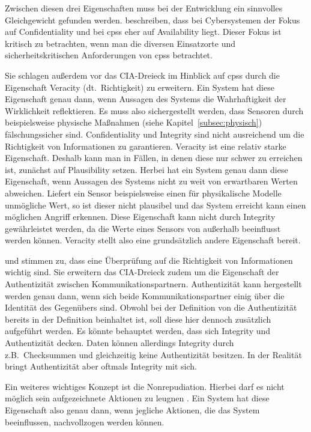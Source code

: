 \documentclass[final,bibliography=totocnumbered]{include/sikseminar}
\newcommand{\cps}{\glspl{cps}\xspace}
\begin{document}
Zwischen diesen drei Eigenschaften muss bei der Entwicklung ein sinnvolles Gleichgewicht gefunden werden.
\citeauthor{GK16} beschreiben, dass bei Cybersystemen der Fokus auf Confidentiality und bei \cps eher auf Availability liegt.
Dieser Fokus ist kritisch zu betrachten, wenn man die diversen Einsatzorte und sicherheitskritischen Anforderungen von \cps betrachtet.

Sie schlagen außerdem vor das CIA-Dreieck im Hinblick auf \cps durch die Eigenschaft Veracity (dt.~Richtigkeit) zu erweitern.
Ein System hat diese Eigenschaft genau dann, wenn Aussagen des Systems die Wahrhaftigkeit der  Wirklichkeit reflektieren.
Es muss also sichergestellt werden, dass Sensoren durch beispielsweise physische Maßnahmen (siehe Kapitel~\ref{subsec:physisch}) fälschungssicher sind.
Confidentiality und Integrity sind nicht ausreichend um die Richtigkeit von Informationen zu garantieren.
Veracity ist eine relativ starke Eigenschaft.
Deshalb kann man in Fällen, in denen diese nur schwer zu erreichen ist, zunächst auf Plausibility setzen.
Herbei hat ein System genau dann diese Eigenschaft, wenn Aussagen des Systems nicht zu weit von erwartbaren Werten abweichen.
Liefert ein Sensor beispielsweise einen für physikalische Modelle unmögliche Wert, so ist dieser nicht plausibel und das System erreicht kann einen möglichen Angriff erkennen. \cite{GK16}
Diese Eigenschaft kann nicht durch Integrity gewährleistet werden, da die Werte eines Sensors von außerhalb beeinflusst werden können.
Veracity stellt also eine grundsätzlich andere Eigenschaft bereit.

\citeauthor{WYX+10} und \citeauthor{SFJ17} stimmen zu, dass eine Überprüfung auf die Richtigkeit von Informationen wichtig sind.
Sie erweitern das CIA-Dreieck zudem um die Eigenschaft der Authentizität zwischen Kommunikationspartnern.
Authentizität kann hergestellt werden genau dann, wenn sich beide Kommunikationspartner einig über die Identität des Gegenübers sind.\label{def:authenticity}
Obwohl bei der Definition von \citeauthor{CH13} die Authentizität bereits in der Definition beinhaltet ist, soll diese hier dennoch zusätzlich aufgeführt werden.
Es könnte behauptet werden, dass sich Integrity und Authentizität decken.
Daten können allerdings Integrity durch z.B.\ Checksummen und gleichzeitig keine Authentizität besitzen.
In der Realität bringt Authentizität aber oftmals Integrity mit sich.

Ein weiteres wichtiges Konzept ist die Nonrepudiation. %
Hierbei darf es nicht möglich sein aufgezeichnete Aktionen zu leugnen \cite{NIST13}.
Ein System hat diese Eigenschaft also genau dann, wenn jegliche Aktionen, die das System beeinflussen, nachvollzogen werden können. \label{def:nonrepudiation}
\end{document}
